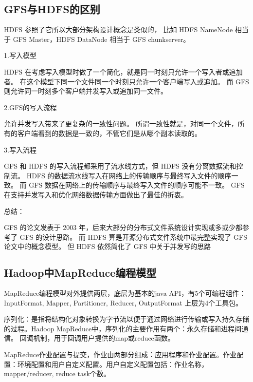 \subsection{GFS与HDFS的区别}
HDFS 参照了它所以大部分架构设计概念是类似的，
比如 HDFS NameNode 相当于 GFS Master，HDFS DataNode 相当于 GFS chunkserver。

1.写入模型

HDFS 在考虑写入模型时做了一个简化，就是同一时刻只允许一个写入者或追加者。 
在这个模型下同一个文件同一个时刻只允许一个客户端写入或追加。
而 GFS 则允许同一时刻多个客户端并发写入或追加同一文件。

2.GFS的写入流程

允许并发写入带来了更复杂的一致性问题。 
所谓一致性就是，对同一个文件，所有的客户端看到的数据是一致的，不管它们是从哪个副本读取的。

3.写入流程

GFS 和 HDFS 的写入流程都采用了流水线方式，但 HDFS 没有分离数据流和控制流。
HDFS 的数据流水线写入在网络上的传输顺序与最终写入文件的顺序一致。
而 GFS 数据在网络上的传输顺序与最终写入文件的顺序可能不一致。
GFS 在支持并发写入和优化网络数据传输方面做出了最佳的折衷。

总结：

GFS 的论文发表于 2003 年，后来大部分的分布式文件系统设计实现或多或少都参考了 GFS 的设计思路。
而 HDFS 算是开源分布式文件系统中最完整实现了 GFS 论文中的概念模型。 
但 HDFS 依然简化了 GFS 中关于并发写的思路

\subsection{Hadoop中MapReduce编程模型}
MapReduce编程模型对外提供两层，底层为基本的java API，有5个可编程组件：InputFormat, Mapper, Partitioner, Reducer, OutputFormat
上层为4个工具包。

序列化：是指将结构化对象转换为字节流以便于通过网络进行传输或写入持久存储的过程。Hadoop MapReduce中，序列化的主要作用有两个：永久存储和进程间通信。
回调机制，用于回调用户提供的map或reduce函数。

MapReduce作业配置与提交，作业由两部分组成：应用程序和作业配置。作业配置：环境配置和用户自定义配置。用户自定义配置包括：作业名称，mapper/reducer, reduce task个数。
